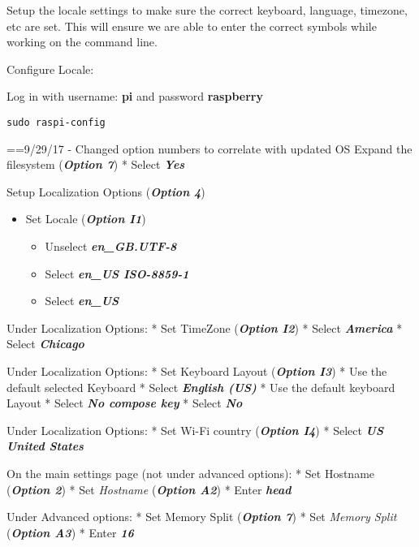 \documentclass[]{article}
\providecommand{\tightlist}{%
  \setlength{\itemsep}{0pt}\setlength{\parskip}{0pt}}
\begin{document}
Setup the locale settings to make sure the correct keyboard, language,
timezone, etc are set. This will ensure we are able to enter the correct
symbols while working on the command line.

Configure Locale:

Log in with username: \textbf{pi} and password \textbf{raspberry}

\begin{verbatim}
sudo raspi-config
\end{verbatim}

==9/29/17 - Changed option numbers to correlate with updated OS Expand
the filesystem (\emph{\textbf{Option 7}}) * Select \emph{\textbf{Yes}}

Setup Localization Options (\emph{\textbf{Option 4}})

\begin{itemize}
\tightlist
\item
  Set Locale (\emph{\textbf{Option I1}})

  \begin{itemize}
  \tightlist
  \item
    Unselect \emph{\textbf{en\_GB.UTF-8}}
  \item
    Select \emph{\textbf{en\_US ISO-8859-1}}
  \item
    Select \emph{\textbf{en\_US}}
  \end{itemize}
\end{itemize}

Under Localization Options: * Set TimeZone (\emph{\textbf{Option I2}}) *
Select \emph{\textbf{America}} * Select \emph{\textbf{Chicago}}

Under Localization Options: * Set Keyboard Layout (\emph{\textbf{Option
I3}}) * Use the default selected Keyboard * Select \emph{\textbf{English
(US)}} * Use the default keyboard Layout * Select \emph{\textbf{No
compose key}} * Select \emph{\textbf{No}}

Under Localization Options: * Set Wi-Fi country (\emph{\textbf{Option
I4}}) * Select \emph{\textbf{US United States}}

On the main settings page (not under advanced options): * Set Hostname
(\emph{\textbf{Option 2}}) * Set \emph{Hostname} (\emph{\textbf{Option
A2}}) * Enter \emph{\textbf{head}}

Under Advanced options: * Set Memory Split (\emph{\textbf{Option 7}}) *
Set \emph{Memory Split} (\emph{\textbf{Option A3}}) * Enter
\emph{\textbf{16}}
\end{document}
